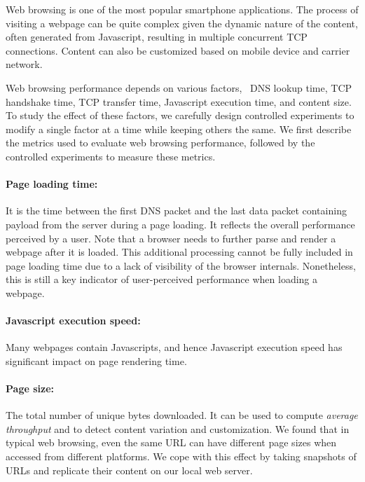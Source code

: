 Web browsing is one of the most popular smartphone applications. The 
process of visiting a webpage can be quite complex given the dynamic 
nature of the content, often generated from Javascript, resulting in 
multiple concurrent TCP connections. Content can also be customized 
based on mobile device and carrier network.

Web browsing performance depends on various factors, \eg~DNS lookup 
time, TCP handshake time, TCP transfer time, Javascript execution 
time, and content size. To study the effect of these factors, we 
carefully design controlled experiments to modify a single factor 
at a time while keeping others the same. We first describe the metrics 
used to evaluate web browsing performance, followed by the controlled 
experiments to measure these metrics.

\label{sec:app.web_metrics}

\paragraph{Page loading time:} It is the time between the first DNS packet 
and the last data packet containing payload from the server during a 
page loading. It reflects the overall performance perceived by a user. 
Note that a browser needs to further parse and render a webpage after 
it is loaded. This additional processing cannot be fully included in 
page loading time due to a lack of visibility of the browser internals. 
Nonetheless, this is still a key indicator of user-perceived performance 
when loading a webpage. 


\paragraph{Javascript execution speed:} Many webpages contain 
Javascripts, and hence Javascript execution speed has significant
impact on page rendering time. 



\paragraph{Page size:} The total number of unique bytes downloaded. 
It can be used to compute {\it average throughput} and to detect 
content variation and customization. 
We found that in typical web browsing, even the same URL can have different 
page sizes when accessed from different platforms. We cope with this 
effect by taking snapshots of URLs and replicate their content on our 
local web server.

